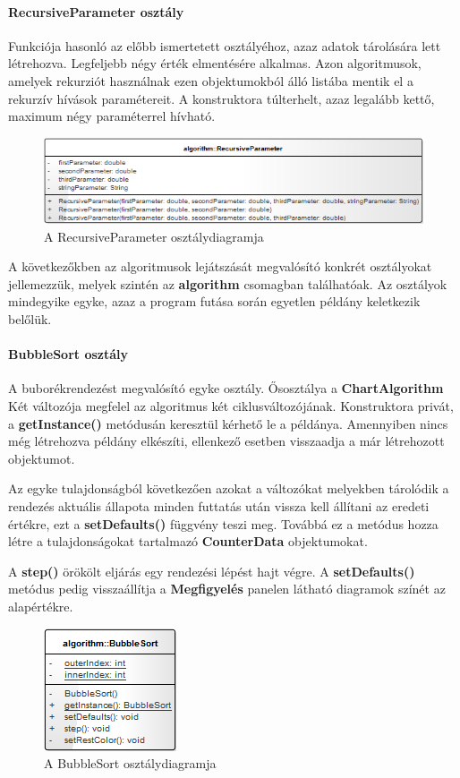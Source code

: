 \documentclass{elteikthesis}
\begin{document}
\paragraph{RecursiveParameter osztály}
Funkciója hasonló az előbb ismertetett osztályéhoz, azaz adatok tárolására lett létrehozva. Legfeljebb négy érték elmentésére alkalmas. Azon algoritmusok, amelyek rekurziót használnak ezen objektumokból álló listába mentik el a rekurzív hívások paramétereit. A konstruktora túlterhelt, azaz legalább kettő, maximum négy paraméterrel hívható.
\begin{figure}[H]
	\centering
	\includegraphics[width=\textwidth]{pics/class/RecursiveParameter.png}
	\caption{A RecursiveParameter osztálydiagramja}
\end{figure}
A következőkben az algoritmusok lejátszását megvalósító konkrét osztályokat jellemezzük, melyek szintén az \textbf{algorithm} csomagban találhatóak. Az osztályok mindegyike egyke, azaz a program futása során egyetlen példány keletkezik belőlük.
\paragraph{BubbleSort osztály}
A buborékrendezést megvalósító egyke osztály. Ősosztálya a \textbf{ChartAlgorithm} Két változója megfelel az algoritmus két ciklusváltozójának. Konstruktora privát, a \textbf{getInstance()} metódusán keresztül kérhető le a példánya. Amennyiben nincs még létrehozva példány elkészíti, ellenkező esetben visszaadja a már létrehozott objektumot.\par
Az egyke tulajdonságból következően azokat a változókat melyekben tárolódik a rendezés aktuális állapota minden futtatás után vissza kell állítani az eredeti értékre, ezt a \textbf{setDefaults()} függvény teszi meg. Továbbá ez a metódus hozza létre a tulajdonságokat tartalmazó \textbf{CounterData} objektumokat.\par
A \textbf{step()} örökölt eljárás egy rendezési lépést hajt végre. A \textbf{setDefaults()} metódus pedig visszaállítja a \textbf{Megfigyelés} panelen látható diagramok színét az alapértékre.
\begin{figure}[H]
	\centering
	\includegraphics{pics/class/BubbleSort.png}
	\caption{A BubbleSort osztálydiagramja}
\end{figure}
\end{document}
